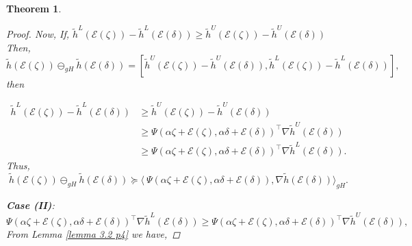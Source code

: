 \documentclass[12pt, reqno]{amsart}
\newtheorem{theorem}{Theorem}[section]
\theoremstyle{definition}
\theoremstyle{remark}
\numberwithin{equation}{section}
\begin{document}
\begin{theorem}
\begin{proof}
Now, If, $\tilde{h}^L(\mathcal{\mathcal{E}}(\mathit{\zeta} )) - \tilde{h}^L(\mathcal{\mathcal{E}}(\mathit{\delta} )) \geq \tilde{h}^U(\mathcal{\mathcal{E}}(\mathit{\zeta} )) - \tilde{h}^U(\mathcal{\mathcal{E}}(\mathit{\delta} ))$
Then,
\begin{equation*}
   \tilde{h}(\mathcal{\mathcal{E}}(\mathit{\zeta} )) \ominus_{gH}\tilde{h}(\mathcal{\mathcal{E}}(\mathit{\delta} )) = [\tilde{h}^U(\mathcal{\mathcal{E}}(\mathit{\zeta} )) - \tilde{h}^U(\mathcal{\mathcal{E}}(\mathit{\delta} )), \tilde{h}^L(\mathcal{\mathcal{E}}(\mathit{\zeta} )) - \tilde{h}^L(\mathcal{\mathcal{E}}(\mathit{\delta} ))],
\end{equation*} 
then

\begin{equation*}
    \begin{aligned}
        \tilde{h}^L(\mathcal{\mathcal{E}}(\mathit{\zeta} )) - \tilde{h}^L(\mathcal{\mathcal{E}}(\mathit{\delta} )) 
&\geq \tilde{h}^U(\mathcal{\mathcal{E}}(\mathit{\zeta} )) - \tilde{h}^U(\mathcal{\mathcal{E}}(\mathit{\delta} )) \\
&\geq \Psi(\alpha \mathit{\zeta} +\mathcal{\mathcal{E}}(\mathit{\zeta} ),\alpha \mathit{\delta} +\mathcal{\mathcal{E}}(\mathit{\delta} ))^{\!\top}\nabla \tilde{h}^U(\mathcal{\mathcal{E}}(\mathit{\delta} )) \\
&\geq \Psi(\alpha \mathit{\zeta} +\mathcal{\mathcal{E}}(\mathit{\zeta} ),\alpha \mathit{\delta} +\mathcal{\mathcal{E}}(\mathit{\delta} ))^{\!\top}\nabla \tilde{h}^L(\mathcal{\mathcal{E}}(\mathit{\delta} )).
    \end{aligned}
\end{equation*}
Thus,
\begin{equation*}
   \tilde{h}(\mathcal{\mathcal{E}}(\mathit{\zeta} )) \ominus_{gH}\tilde{h}(\mathcal{\mathcal{E}}(\mathit{\delta} )) \succeq \langle\ {\Psi}( {\alpha} \mathit{\zeta} + \mathcal{\mathcal{E}}(\mathit{\zeta} ), {\alpha}\mathit{\delta} + \mathcal{\mathcal{E}}(\mathit{\delta} )),\nabla  \tilde{h}( \mathcal{\mathcal{E}}(\mathit{\delta} ))\rangle_{gH}.
\end{equation*}

\textbf{Case (II)}:
\begin{equation*}
    \Psi(\alpha \mathit{\zeta} +\mathcal{\mathcal{E}}(\mathit{\zeta} ),\alpha \mathit{\delta} +\mathcal{\mathcal{E}}(\mathit{\delta} ))^{\!\top}\nabla \tilde{h}^L(\mathcal{\mathcal{E}}(\mathit{\delta} )) \geq \Psi(\alpha \mathit{\zeta} +\mathcal{\mathcal{E}}(\mathit{\zeta} ),\alpha \mathit{\delta} +\mathcal{\mathcal{E}}(\mathit{\delta} ))^{\!\top}\nabla \tilde{h}^U(\mathcal{\mathcal{E}}(\mathit{\delta} )),
\end{equation*} 
From Lemma \ref{lemma 3.2 p4} we have,


\end{proof}
\end{theorem}
\end{document}
